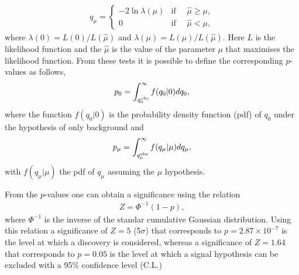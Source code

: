 \documentclass[12pt,a4paper]{article}
\begin{document}
\begin{align}
q_\mu = \left \{ 
\begin{matrix} 
-2\ln \lambda (\mu) & \mbox{if }\quad\hat{\mu}\geq \mu,\\ 0 & \mbox{if }\quad\hat{\mu}< \mu,\end{matrix}\right.\label{eq_qmutest}  
\end{align}
where $\lambda(0)= L(0)/L(\hat\mu)$ and $\lambda(\mu)=L(\mu)/L(\hat\mu)$. Here $L$ is the likelihood function and the $\hat{\mu}$ is the value of the parameter $\mu$ that maximises the likelihood function. From these tests it is possible to define the corresponding $p$-values as follows,
\begin{align}
p_0=\int_{q_0^{{\rm obs}}}^{\infty}f(q_0|0)dq_0,
\end{align}
where the function $f(q_0|0)$ is the probability density function (pdf) of $q_0$ under the hypothesis of only background and
\begin{align}
p_\mu=\int_{q_\mu^{{\rm obs}}}^{\infty}f(q_\mu|\mu)dq_\mu,
\end{align}
with $f(q_\mu|\mu)$ the pdf of $q_\mu$ assuming the $\mu$ hypothesis. 

From the $p$-values one can obtain a significance using the relation
\begin{align}
Z=\Phi^{-1}(1-p),
\end{align}
where $\Phi^{-1}$ is the inverse of the standar cumulative Gaussian distribution. Using this relation a significance of $Z=5$ (5$\sigma$) that corresponds to $p=2.87\times 10^{-7}$ is the level at which a discovery is considered, whereas a significance of $Z=1.64$ that corresponds to $p=0.05$ is the level at which a signal hypothesis can be excluded with a 95\% confidence level (C.L.) 
\end{document}
